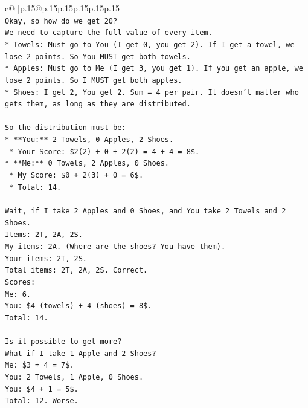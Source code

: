 \documentclass{article}
\begin{document}
{\begin{supertabular}{c@{$\;$}|p{.15\linewidth}@{}p{.15\linewidth}p{.15\linewidth}p{.15\linewidth}p{.15\linewidth}p{.15\linewidth}}
{{{\\ 
\texttt{Okay, so how do we get 20?} \\
\texttt{We need to capture the full value of every item.} \\
\texttt{*   Towels: Must go to You (I get 0, you get 2). If I get a towel, we lose 2 points. So You MUST get both towels.} \\
\texttt{*   Apples: Must go to Me (I get 3, you get 1). If you get an apple, we lose 2 points. So I MUST get both apples.} \\
\texttt{*   Shoes: I get 2, You get 2. Sum = 4 per pair. It doesn't matter who gets them, as long as they are distributed.} \\
\\ 
\texttt{So the distribution must be:} \\
\texttt{*   **You:** 2 Towels, 0 Apples, 2 Shoes.} \\
\texttt{    *   Your Score: \$2(2) + 0 + 2(2) = 4 + 4 = 8\$.} \\
\texttt{*   **Me:** 0 Towels, 2 Apples, 0 Shoes.} \\
\texttt{    *   My Score: \$0 + 2(3) + 0 = 6\$.} \\
\texttt{    *   Total: 14.} \\
\\ 
\texttt{Wait, if I take 2 Apples and 0 Shoes, and You take 2 Towels and 2 Shoes.} \\
\texttt{Items: 2T, 2A, 2S.} \\
\texttt{My items: 2A. (Where are the shoes? You have them).} \\
\texttt{Your items: 2T, 2S.} \\
\texttt{Total items: 2T, 2A, 2S. Correct.} \\
\texttt{Scores:} \\
\texttt{Me: 6.} \\
\texttt{You: \$4 (towels) + 4 (shoes) = 8\$.} \\
\texttt{Total: 14.} \\
\\ 
\texttt{Is it possible to get more?} \\
\texttt{What if I take 1 Apple and 2 Shoes?} \\
\texttt{Me: \$3 + 4 = 7\$.} \\
\texttt{You: 2 Towels, 1 Apple, 0 Shoes.} \\
\texttt{You: \$4 + 1 = 5\$.} \\
\texttt{Total: 12. Worse.} \\
\\ 
}}}
\end{supertabular}}
\end{document}
